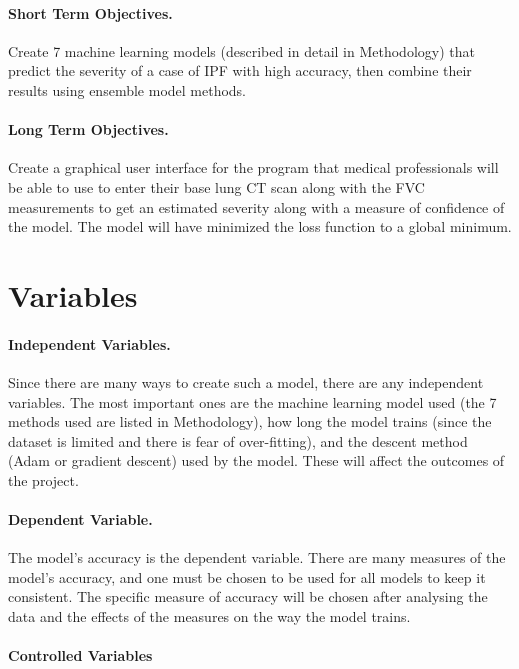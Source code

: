 \documentclass[12pt]{article}
\begin{document}
\paragraph*{Short Term Objectives.}

Create 7 machine learning models (described in detail in Methodology) that predict the severity of a case of IPF with high accuracy, then combine their results using ensemble model methods.

\paragraph*{Long Term Objectives.}

Create a graphical user interface for the program that medical professionals will be able to use to enter their base lung CT scan along with the FVC measurements to get an estimated severity along with a measure of confidence of the model. 
The model will have minimized the loss function to a global minimum. 

\section*{Variables}

\paragraph*{Independent Variables.}

Since there are many ways to create such a model, there are any independent variables. 
The most important ones are the machine learning model used (the 7 methods used are listed in Methodology), how long the model trains (since the dataset is limited and there is fear of over-fitting), and the descent method (Adam or gradient descent) used by the model.
These will affect the outcomes of the project.

\paragraph*{Dependent Variable.}

The model's accuracy is the dependent variable.
There are many measures of the model's accuracy, and one must be chosen to be used for all models to keep it consistent.
The specific measure of accuracy will be chosen after analysing the data and the effects of the measures on the way the model trains.

\paragraph*{Controlled Variables}
\end{document}
